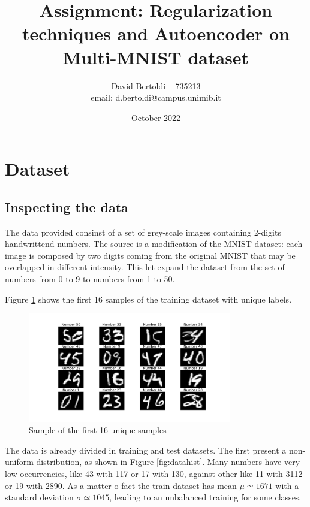 \documentclass[compsoc]{IEEEtran}
\title{Assignment: Regularization techniques and Autoencoder on Multi-MNIST dataset}
\author{David Bertoldi -- 735213 \\ email: d.bertoldi@campus.unimib.it}
\affil{Department of Informatics, Systems and Communication}
\affil{University of Milano-Bicocca}
\date{October 2022}
\begin{document}
\maketitle 
\section{Dataset}
\subsection{Inspecting the data}
The data provided consinst of a set of grey-scale images containing 2-digits handwrittend numbers.
The source is a modification of the MNIST dataset: each image is composed by two digits coming from
the original MNIST that may be overlapped in different intensity. This let expand the dataset from
the set of numbers from 0 to 9 to numbers from 1 to 50. \par

Figure \ref{fig:sample} shows the first 16 samples of the training dataset with unique labels.

\begin{figure}[ht!]
\centering                                                                        
\includegraphics[width=3.5in]{sample.png}
\captionsetup{justification=centering}                                                                                                                                   
\caption{Sample of the first 16 unique samples}
\label{fig:sample}
\end{figure}

The data is already divided in training and test datasets. The first present a non-uniform distribution,
as shown in Figure \ref{fig:datahist}. 
Many numbers have very low occurrencies, like 43 with 117 or 17 with 130, against other like 11 with 3112 or 19 with 2890.
As a matter o fact the train dataset has mean $\mu\simeq 1671$ with a standard deviation $\sigma\simeq 1045$, leading to
an unbalanced training for some classes.
\end{document}
